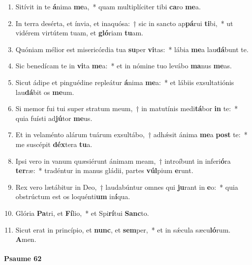 \documentclass[twoside]{article}
\begin{document}
\begin{paracol}[1]{2}
\begin{enumerate}[wide, itemsep=0mm, labelwidth=!, labelindent=0pt, label=\color{gregoriocolor}\theenumi]
\item Sitívit in te \textbf{á}nima \textbf{me}a,~* quam multiplíciter tibi \textbf{ca}ro \textbf{me}a.

\item In terra desérta, et ínvia, et inaquósa:~† sic in sancto ap\textbf{pá}rui \textbf{ti}bi,~* ut vidérem virtútem tuam, et \textbf{gló}riam \textbf{tu}am.

\item Quóniam mélior est misericórdia tua \textbf{su}per \textbf{vi}tas:~* lábia \textbf{me}a lau\textbf{dá}bunt te.

\item Sic benedícam te in \textbf{vi}ta \textbf{me}a:~* et in nómine tuo levábo \textbf{ma}nus \textbf{me}as.

\item Sicut ádipe et pinguédine repleátur \textbf{á}nima \textbf{me}a:~* et lábiis exsultatiónis lau\textbf{dá}bit os \textbf{me}um.

\item Si memor fui tui super stratum meum,~† in matutínis medi\textbf{tá}bor \textbf{in} te:~* quia fuísti ad\textbf{jú}tor \textbf{me}us.

\item Et in velaménto alárum tuárum exsultábo,~† adhǽsit ánima \textbf{me}a \textbf{post} te:~* me suscépit \textbf{déx}tera \textbf{tu}a.

\item Ipsi vero in vanum quæsiérunt ánimam meam,~† introíbunt in inferi\textbf{ó}ra \textbf{ter}ræ:~* tradéntur in manus gládii, partes \textbf{vúl}pium \textbf{e}runt.

\item Rex vero lætábitur in Deo,~† laudabúntur omnes qui \textbf{ju}rant in \textbf{e}o:~* quia obstrúctum est os loquénti\textbf{um} in\textbf{í}qua.

\item Glória \textbf{Pa}tri, et \textbf{Fí}lio,~* et Spi\textbf{rí}tui \textbf{Sanc}to.

\item Sicut erat in princípio, et \textbf{nunc}, et \textbf{sem}per,~* et in sǽcula sæcu\textbf{ló}rum. \textbf{A}men.
\end{enumerate}

\switchcolumn

\paragraph{Psaume 62}


\end{paracol}
\end{document}
